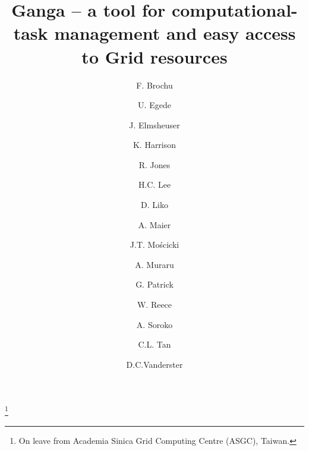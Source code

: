 \documentclass{elsart}
\def\grid {Grid\xspace}
\begin{document}
\begin{frontmatter}



\title{Ganga -- a tool for computational-task management and easy access to \grid
  resources}




\author[a:Cambridge]{F. Brochu}
\author[a:Imperial]{U. Egede}
\author[a:Munich]{J. Elmsheuser}
\author[a:Cambridge]{K. Harrison}
\author[a:Lancaster]{R. Jones}
\author[a:CERN]{H.C. Lee}
\author[a:CERN]{D. Liko}
\author[a:CERN]{A. Maier}
\author[a:CERN]{J.T. Mo{\'s}cicki}
\author[a:CERN]{A. Muraru}
\author[a:STFC]{G. Patrick}
\author[a:Imperial]{W. Reece}
\author[a:Oxford]{A. Soroko}
\author[a:Birmingham]{C.L. Tan}
\author[a:CERN]{D.C.Vanderster}

\address[a:Cambridge]{University of Cambridge, Cambridge, United Kingdom}
\address[a:Imperial]{Imperial College London, London, United Kingdom}
\address[a:Munich]{Ludwig-Maximilians-Universit\"{a}t, M\"{u}nchen, Germany}
\address[a:Lancaster]{Lancaster University, Lancaster, United Kingdom}
\address[a:CERN]{CERN, Geneva, Switzerland}
\address[a:STFC]{Science \& Technology Facilities Council, United Kingdom}
\address[a:Oxford]{University of Oxford, Oxford, United Kingdom}
\address[a:Birmingham]{University of Birmingham, Birmingham, United Kingdom}

\thanks[HurngChun]{On leave from Academia Sinica Grid Computing Centre (ASGC),
  Taiwan.}


\end{frontmatter}
\end{document}
